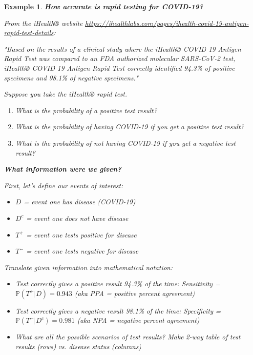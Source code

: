 \documentclass[12pt]{amsart}
\newtheorem{example}[theorem]{Example}
\begin{document}
\begin{example}  {\large \textbf{How accurate is rapid testing for COVID-19?} }

{\large From the iHealth® website  \newline}
{\tiny\url{https://ihealthlabs.com/pages/ihealth-covid-19-antigen-rapid-test-details}}: \newline
{\large "Based on the results of a clinical study where the iHealth® COVID-19 Antigen Rapid Test was compared to an FDA authorized molecular SARS-CoV-2 test, iHealth® COVID-19 Antigen Rapid Test correctly identified 94.3\% of positive specimens and 98.1\% of negative specimens."  \newline

Suppose you take the iHealth® rapid test. 
\begin{enumerate}
	\item What is the probability of a positive test result?
	\item What is the probability of having COVID-19 if you get a positive test result?
	\item What is the probability of not having COVID-19 if you get a negative test result?

\end{enumerate}
\vspace{0.5cm}
\textbf{What information were we given?}%

First, let's define our events of interest: 
\begin{itemize}
	\item $D$ = event one has disease (COVID-19)
	\item $D^c$ = event one does not have disease
	\item $T^+$ = event one tests positive for disease
	\item $T^-$ = event one tests negative for disease
\end{itemize}
\vspace{0.5cm}
Translate given information into mathematical notation:
\begin{itemize}
	\item Test correctly gives a positive result 94.3\% of the time:\newline
	Sensitivity  = $\mathbb{P}(T^+|D) = 0.943$
	\newline (aka PPA = positive percent agreement)
\vspace{0.5cm}
	\item Test correctly gives a negative result 98.1\% of the time: \newline 
	Specificity = $\mathbb{P}(T^-|D^c) = 0.981$ 
	\newline (aka NPA = negative percent agreement)
\vspace{0.5cm}
	\item What are all the possible scenarios of test results?
	Make 2-way table of test results (rows) vs. disease status (columns)


\end{itemize}}
\end{example}
\end{document}
